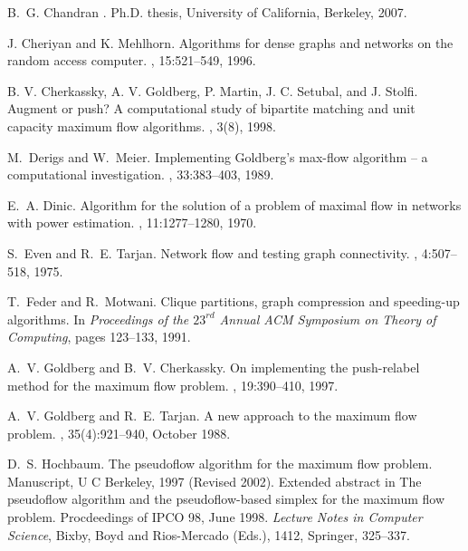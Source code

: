 \documentclass{article}
\begin{document}
\begin{thebibliography}{99}
B.~G. Chandran
.
\newblock Ph.D. thesis, University of California, Berkeley, 2007.

J. Cheriyan and K. Mehlhorn.
\newblock Algorithms for dense graphs and networks on the random access computer.
, 15:521--549, 1996.

\newblock B. V. Cherkassky, A. V. Goldberg, P. Martin, J. C. Setubal,
and J. Stolfi.
\newblock Augment or push? A computational study of bipartite matching and unit capacity maximum flow algorithms.
, 3(8), 1998.

M.~Derigs and W.~Meier.
\newblock Implementing {G}oldberg's max-flow algorithm -- a computational investigation.
, 33:383--403, 1989.

E.~A. Dinic.
\newblock Algorithm for the solution of a problem of maximal flow in networks with power estimation.
, 11:1277--1280, 1970.

S.~Even and R.~E. Tarjan.
\newblock Network flow and testing graph connectivity.
, 4:507--518, 1975.

T.~Feder and R.~Motwani.
\newblock Clique partitions, graph compression and speeding-up algorithms.
\newblock In {\em Proceedings of the $23^{rd}$ Annual ACM Symposium on Theory of Computing}, pages 123--133, 1991.

A.~V. Goldberg and B.~V. Cherkassky.
\newblock On implementing the push-relabel method for the maximum flow problem.
, 19:390--410, 1997.

A.~V. Goldberg and R.~E. Tarjan.
\newblock A new approach to the maximum flow problem.
, 35(4):921--940, October 1988.

D.~S. Hochbaum.
\newblock The pseudoflow algorithm for the maximum flow problem.
\newblock Manuscript, U C Berkeley, 1997 (Revised 2002). Extended abstract in The pseudoflow algorithm and the pseudoflow-based simplex for the maximum flow problem. Procdeedings of IPCO 98, June 1998.  {\em Lecture Notes in Computer Science}, Bixby, Boyd and Rios-Mercado (Eds.), 1412, Springer, 325--337.


\end{thebibliography}
\end{document}
